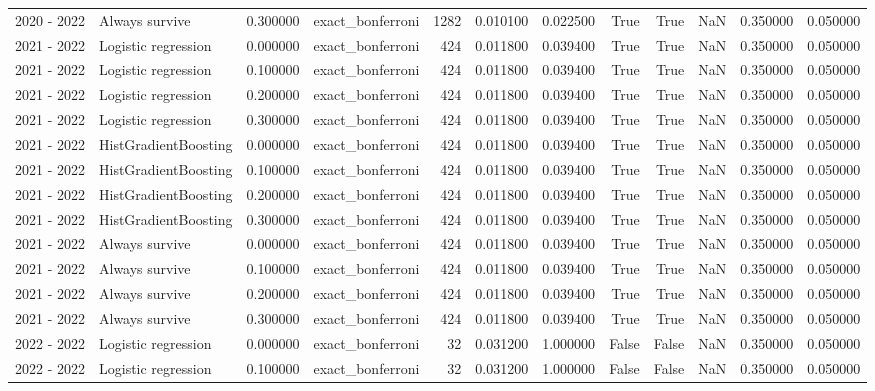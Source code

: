 \begin{tabular}{llrlrrrrrrrr}
2020 - 2022 & Always survive & 0.300000 & exact_bonferroni & 1282 & 0.010100 & 0.022500 & True & True & NaN & 0.350000 & 0.050000 \\
2021 - 2022 & Logistic regression & 0.000000 & exact_bonferroni & 424 & 0.011800 & 0.039400 & True & True & NaN & 0.350000 & 0.050000 \\
2021 - 2022 & Logistic regression & 0.100000 & exact_bonferroni & 424 & 0.011800 & 0.039400 & True & True & NaN & 0.350000 & 0.050000 \\
2021 - 2022 & Logistic regression & 0.200000 & exact_bonferroni & 424 & 0.011800 & 0.039400 & True & True & NaN & 0.350000 & 0.050000 \\
2021 - 2022 & Logistic regression & 0.300000 & exact_bonferroni & 424 & 0.011800 & 0.039400 & True & True & NaN & 0.350000 & 0.050000 \\
2021 - 2022 & HistGradientBoosting & 0.000000 & exact_bonferroni & 424 & 0.011800 & 0.039400 & True & True & NaN & 0.350000 & 0.050000 \\
2021 - 2022 & HistGradientBoosting & 0.100000 & exact_bonferroni & 424 & 0.011800 & 0.039400 & True & True & NaN & 0.350000 & 0.050000 \\
2021 - 2022 & HistGradientBoosting & 0.200000 & exact_bonferroni & 424 & 0.011800 & 0.039400 & True & True & NaN & 0.350000 & 0.050000 \\
2021 - 2022 & HistGradientBoosting & 0.300000 & exact_bonferroni & 424 & 0.011800 & 0.039400 & True & True & NaN & 0.350000 & 0.050000 \\
2021 - 2022 & Always survive & 0.000000 & exact_bonferroni & 424 & 0.011800 & 0.039400 & True & True & NaN & 0.350000 & 0.050000 \\
2021 - 2022 & Always survive & 0.100000 & exact_bonferroni & 424 & 0.011800 & 0.039400 & True & True & NaN & 0.350000 & 0.050000 \\
2021 - 2022 & Always survive & 0.200000 & exact_bonferroni & 424 & 0.011800 & 0.039400 & True & True & NaN & 0.350000 & 0.050000 \\
2021 - 2022 & Always survive & 0.300000 & exact_bonferroni & 424 & 0.011800 & 0.039400 & True & True & NaN & 0.350000 & 0.050000 \\
2022 - 2022 & Logistic regression & 0.000000 & exact_bonferroni & 32 & 0.031200 & 1.000000 & False & False & NaN & 0.350000 & 0.050000 \\
2022 - 2022 & Logistic regression & 0.100000 & exact_bonferroni & 32 & 0.031200 & 1.000000 & False & False & NaN & 0.350000 & 0.050000 \\

\end{tabular}
